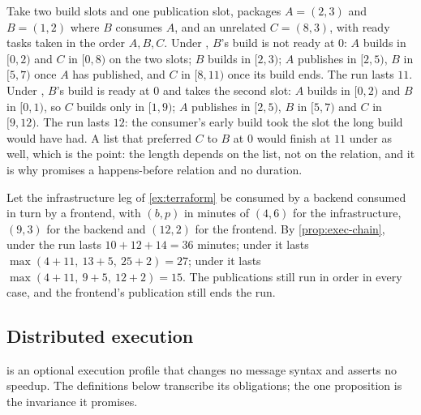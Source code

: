 \begin{example}
\label{ex:exec-anomaly}
Take two build slots and one publication slot, packages $A = (2, 3)$ and $B =
(1, 2)$ where $B$ consumes $A$, and an unrelated $C = (8, 3)$, with ready tasks
taken in the order $A, B, C$. Under , $B$'s build is not ready at
$0$: $A$ builds in $[0,2)$ and $C$ in $[0,8)$ on the two slots; $B$ builds in
$[2,3)$; $A$ publishes in $[2,5)$, $B$ in $[5,7)$ once $A$ has published, and
$C$ in $[8,11)$ once its build ends. The run lasts $11$. Under ,
$B$'s build is ready at $0$ and takes the second slot: $A$ builds in $[0,2)$
and $B$ in $[0,1)$, so $C$ builds only in $[1,9)$; $A$ publishes in $[2,5)$,
$B$ in $[5,7)$ and $C$ in $[9,12)$. The run lasts $12$: the consumer's early
build took the slot the long build would have had. A list that preferred $C$
to $B$ at $0$ would finish at $11$ under  as well, which is the
point: the length depends on the list, not on the relation, and it is why
 promises a happens-before relation and no duration.
\end{example}

\begin{example}
\label{ex:exec-chain}
Let the infrastructure leg of \cref{ex:terraform} be consumed by a backend
consumed in turn by a frontend, with $(b, p)$ in minutes of $(4, 6)$ for the
infrastructure, $(9, 3)$ for the backend and $(12, 2)$ for the frontend. By
\cref{prop:exec-chain}, under  the run lasts $10 + 12 + 14 = 36$
minutes; under  it lasts $\max(4 + 11,\ 13 + 5,\ 25 + 2) = 27$;
under  it lasts $\max(4 + 11,\ 9 + 5,\ 12 + 2) = 15$. The
publications still run in order in every case, and the frontend's publication
still ends the run.
\end{example}

\subsection{Distributed execution}
\label{sec:exec-distributed}

 is an optional execution profile that changes no message syntax and
asserts no speedup. The definitions below transcribe its obligations; the one
proposition is the invariance it promises.

